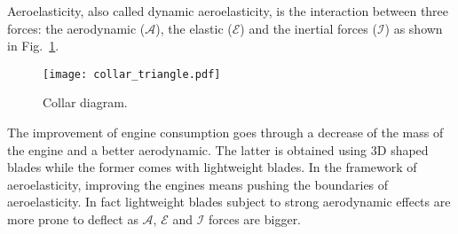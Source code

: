 
Aeroelasticity, also called dynamic aeroelasticity,
is the interaction between three forces:
the aerodynamic ($\mathcal{A}$), the elastic ($\mathcal{E}$) and
the inertial forces ($\mathcal{I}$) as 
shown in Fig.~\ref{fig:ael_collar_triangle}. 
\begin{figure}[htb]
  \centering
  \texttt{[image: collar\_triangle.pdf]}
  \caption{Collar diagram.}
  \label{fig:ael_collar_triangle}
\end{figure}

The improvement of engine consumption goes through a 
decrease of the mass of the engine and a better aerodynamic.
The latter is obtained using 3D shaped blades while the former
comes with lightweight blades. In the framework of
aeroelasticity, improving the engines means pushing the boundaries
of aeroelasticity. In fact lightweight blades subject
to strong aerodynamic effects are more prone to deflect as 
$\mathcal{A}$, $\mathcal{E}$ and
$\mathcal{I}$ forces are bigger.
